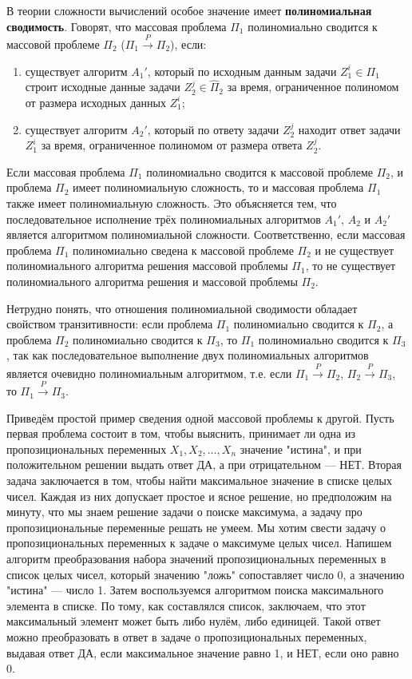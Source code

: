 \documentclass[a4paper,12pt]{article}
\begin{document}
В теории сложности вычислений особое значение имеет \textbf{полиномиальная сводимость}. Говорят, что массовая проблема \(\Pi_1\) полиномиально сводится к массовой проблеме \(\Pi_2\) (\(\Pi_1 \overset{P}{\to} \Pi_2\)), если:
\begin{enumerate}
    \item существует алгоритм \(A_1'\), который по исходным данным задачи \(Z_1^i \in \Pi_1\) строит исходные данные задачи \(Z_2^j \in \hat{\Pi}_2\) за время, ограниченное полиномом от размера исходных данных \(Z_1^i\);
    \item существует алгоритм \(A_2'\), который по ответу задачи \(Z_2^j\) находит ответ задачи \(Z_1^i\) за время, ограниченное полиномом от размера ответа \(Z_2^j\).
\end{enumerate}

Если массовая проблема \(\Pi_1\) полиномиально сводится к массовой проблеме \(\Pi_2\), и проблема \(\Pi_2\) имеет полиномиальную сложность, то и массовая проблема \(\Pi_1\) также имеет полиномиальную сложность. Это объясняется тем, что последовательное исполнение трёх полиномиальных алгоритмов \(A_1'\), \(A_2\) и \(A_2'\) является алгоритмом полиномиальной сложности. Соответственно, если массовая проблема \(\Pi_1\) полиномиально сведена к массовой проблеме \(\Pi_2\) и не существует полиномиального алгоритма решения массовой проблемы \(\Pi_1\), то не существует полиномиального алгоритма решения и массовой проблемы \(\Pi_2\).

Нетрудно понять, что отношения полиномиальной сводимости обладает свойством транзитивности: если проблема \(\Pi_1\) полиномиально сводится к \(\Pi_2\), а проблема \(\Pi_2\) полиномиально сводится к \(\Pi_3\), то \(\Pi_1\) полиномиально сводится к \(\Pi_3\), так как последовательное выполнение двух полиномиальных алгоритмов является очевидно полиномиальным алгоритмом, т.е. если \(\Pi_1 \overset{P}{\to} \Pi_2\), \(\Pi_2 \overset{P}{\to} \Pi_3\), то \(\Pi_1 \overset{P}{\to} \Pi_3\).

Приведём простой пример сведения одной массовой проблемы к другой. Пусть первая проблема состоит в том, чтобы выяснить, принимает ли одна из пропозициональных переменных \(X_1, X_2, \dots, X_n\) значение "истина", и при положительном решении выдать ответ ДА, а при отрицательном --- НЕТ. Вторая задача заключается в том, чтобы найти максимальное значение в списке целых чисел. Каждая из них допускает простое и ясное решение, но предположим на минуту, что мы знаем решение задачи о поиске максимума, а задачу про пропозициональные переменные решать не умеем. Мы хотим свести задачу о пропозициональных переменных к задаче о максимуме целых чисел. Напишем алгоритм преобразования набора значений пропозициональных переменных в список целых чисел, который значению "ложь" сопоставляет число 0, а значению "истина" --- число 1. Затем воспользуемся алгоритмом поиска максимального элемента в списке. По тому, как составлялся список, заключаем, что этот максимальный элемент может быть либо нулём, либо единицей. Такой ответ можно преобразовать в ответ в задаче о пропозициональных переменных, выдавая ответ ДА, если максимальное значение равно 1, и НЕТ, если оно равно 0.
\end{document}
